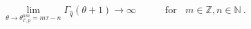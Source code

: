 \begin{equation}
\lim_{\theta \rightarrow \theta _{\Gamma ,p}^{nm}=m\tau -n}\Gamma _{\hat{q}%
}(\theta +1)\rightarrow \infty \qquad \quad \text{for~~}~m\in \mathbb{Z}%
,n\in \mathbb{N}\mathbf{~.}  \label{pG}
\end{equation}


